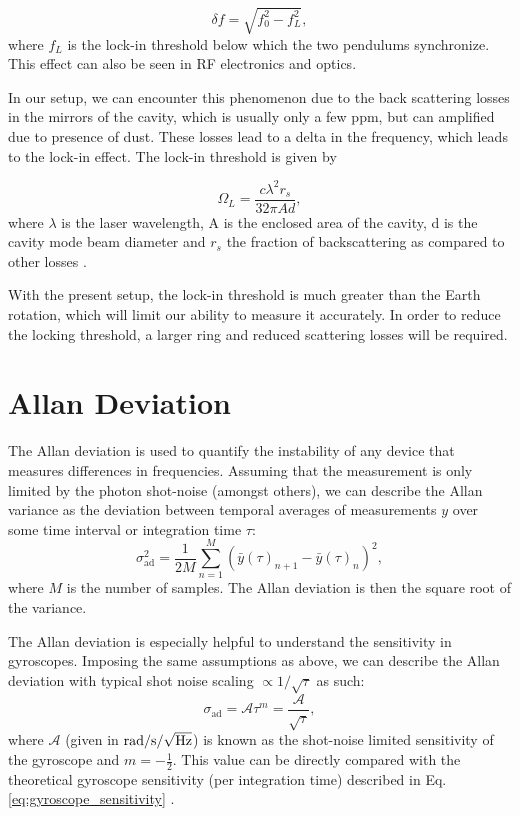 \documentclass[a4paper]{report}
\numberwithin{equation}{section}
\begin{document}
\begin{equation}
		\delta f = \sqrt{f_{0}^2 - f_{L}^2},
\end{equation}
where $f_{L}$ is the lock-in threshold below which the two pendulums synchronize. This effect can also be seen in RF electronics and optics. 

In our setup, we can encounter this phenomenon due to the back scattering losses in the mirrors of the cavity, which is usually only a few ppm, but can amplified due to presence of dust. These losses lead to a delta in the frequency, which leads to the lock-in effect. The lock-in threshold is given by

\begin{equation}
		\Omega_{L} = \frac{c \lambda^2 r_{s}}{32 \pi  A d},
		\label{eq:lockin_thresh}
\end{equation}
where $\lambda$ is the laser wavelength, A is the enclosed area of the cavity, d is the cavity mode beam diameter and $r_{s}$ the fraction of backscattering as compared to other losses \cite{Liu}.

With the present setup, the lock-in threshold is much greater than the Earth rotation, which will limit our ability to measure it accurately. In order to reduce the locking threshold, a larger ring and reduced scattering losses will be required. 

\section{Allan Deviation} \label{sec:allan_dev}

The Allan deviation is used to quantify the instability of any device that measures differences in frequencies. Assuming that the
measurement is only limited by the photon shot-noise (amongst others), we can describe the Allan variance as the deviation
between temporal averages of measurements $y$ over some time interval or integration time $\tau$:
\begin{equation}
	\sigma_{{\text{ad}}}^2 = \frac{1}{2M} \sum\limits_{n=1}^M (\bar{y}(\tau)_{n+1} - \bar{y}(\tau)_n)^2,
	\label{eq:allan_def}
\end{equation}
where $M$ is the number of samples. The Allan deviation is then the square root of the variance. \par 

The Allan deviation is especially helpful to understand the sensitivity in gyroscopes. Imposing the same assumptions as above,
we can describe the Allan deviation with typical shot noise scaling $\propto 1 / \sqrt{\tau}$ as such:
\begin{equation}
	\sigma_{\text{ad}} = \mathcal{A} \tau ^ m = \frac{\mathcal{A}}{\sqrt{\tau}},
	\label{eq:allan_shotnoise}
\end{equation}
where $\mathcal{A}$ (given in $\si{\radian\per\second\per\sqrt{\hertz}}$) is known as the shot-noise limited sensitivity of the gyroscope and $m = -\frac{1}{2}$. This 
value can be directly compared with the theoretical gyroscope sensitivity (per integration time)
described in Eq. \ref{eq:gyroscope_sensitivity} \cite{Groh2021}.
\end{document}
